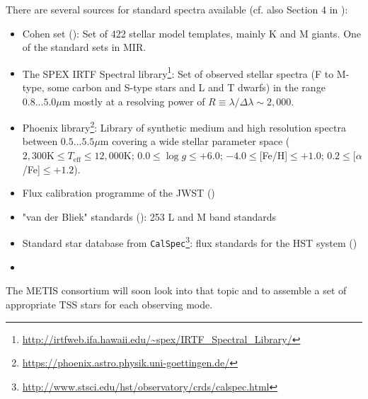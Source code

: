 There are several sources for standard spectra available (cf. also Section 4 in \cite{METIS-calibration_plan}):
\begin{itemize}
    \item Cohen set (\cite{coh99}): Set of 422 stellar model templates, mainly K and M giants. One of the standard sets in \ac{MIR}.
    \item The SPEX \ac{IRTF} Spectral library\footnote{\url{http://irtfweb.ifa.hawaii.edu/~spex/IRTF_Spectral_Library/}}: Set of observed stellar spectra (F to M-type, some carbon and S-type stars and L and T dwarfs) in the range $0.8...5.0\mu$m mostly at a resolving power of $R\equiv\lambda/\Delta\lambda\sim2,000$.
    \item Phoenix library\footnote{\url{https://phoenix.astro.physik.uni-goettingen.de/}}\cite{phoenix}: Library of synthetic medium and high resolution spectra between $0.5...5.5\mu$m covering a wide stellar parameter space ($2,300\textrm{K}\leq T_\textrm{eff}\leq12,000\textrm{K}$; $0.0\leq\log g\leq+6.0$; $-4.0\leq$[Fe/H]$\leq+1.0$; $0.2\leq$[$\alpha$/Fe]$\leq+1.2$). \\
    \item Flux calibration programme of the \ac{JWST} (\cite{gor22})
    \item "van der Bliek" standards (\cite{vdb96}): 253 L and M band standards
    \item Standard star database from \texttt{CalSpec}\footnote{\url{http://www.stsci.edu/hst/observatory/crds/calspec.html}}: flux standards for the \ac{HST} system (\cite{boh14})
    \item 
\end{itemize}
The \ac{METIS} consortium will soon look into that topic and to assemble a set of appropriate \ac{TSS} stars for each observing mode.

